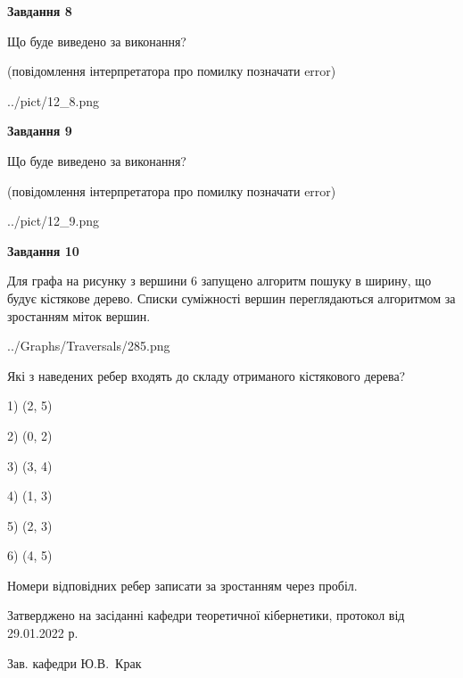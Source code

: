 \documentclass[12pt, ukrainian]{article}
\begin{document}
{\begin {large}
{\begin {center}\textbf{Завдання 8}\end {center}}\par
Що буде виведено за виконання?\par
 (повідомлення інтерпретатора про помилку позначати error)\par
\begin{center}
	{../pict/12_8.png}
\end{center}
\newpage

{\begin {center}\textbf{Завдання 9}\end {center}}\par
Що буде виведено за виконання?\par
 (повідомлення інтерпретатора про помилку позначати error)\par
\begin{center}
	{../pict/12_9.png}
\end{center}
\newpage

{\begin {center}\textbf{Завдання 10}\end {center}}\par
Для графа на рисунку з вершини 6 запущено алгоритм пошуку в ширину, що будує кістякове дерево. Списки суміжності вершин переглядаються алгоритмом за зростанням міток вершин.\par
\begin{center}
	{../Graphs/Traversals/285.png}
\end{center}
\par Які з наведених ребер входять до складу отриманого кістякового дерева?\par
1) (2, 5)\par
2) (0, 2)\par
3) (3, 4)\par
4) (1, 3)\par
5) (2, 3)\par
6) (4, 5)\par
{\vskip 15pt} Номери відповідних ребер записати за зростанням через пробіл.\par
\newpage


\end {large}
}
{\smallskip \begin {small} Затверджено на засіданні кафедри теоретичної кібернетики, протокол  від   29.01.2022 р.\par\smallskip\smallskip
{\parbox {6.5 cm}{Зав. кафедри \dotfill Ю.В.~Крак}} \end{small}}
\end{document}
